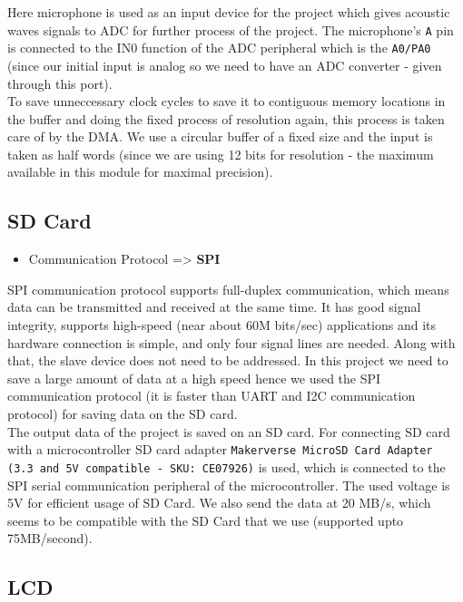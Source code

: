 \documentclass[11pt]{article}
\begin{document}
Here microphone is used as an input device for the project which gives acoustic waves signals to ADC for further process of the project. The microphone’s \texttt{A} pin is connected to the IN0 function of the ADC peripheral which is the \texttt{A0/PA0} (since our initial input is analog so we need to have an ADC converter - given through this port). \\

To save unneccessary clock cycles to save it to contiguous memory locations in the buffer and doing the fixed process of resolution again, this process is taken care of by the DMA. We use a circular buffer of a fixed size and the input is taken as half words (since we are using 12 bits for resolution - the maximum available in this module for maximal precision).


\subsection{SD Card}
\label{sec:org0bc22ef}

\begin{itemize}
\item Communication Protocol => \textbf{SPI}
\end{itemize}

SPI communication protocol supports full-duplex communication, which means data can be transmitted and received at the same time. It has good signal integrity, supports high-speed (near about 60M bits/sec) applications and its hardware connection is simple, and only four signal lines are needed. Along with that, the slave device does not need to be addressed. In this project we need to save a large amount of data at a high speed hence we used the SPI communication protocol (it is faster than UART and I2C communication protocol) for saving data on the SD card. \\

The output data of the project is saved on an SD card. For connecting SD card with a microcontroller SD card adapter \texttt{Makerverse MicroSD Card Adapter (3.3 and 5V compatible - SKU: CE07926)} is used, which is connected to the SPI serial communication peripheral of the microcontroller. The used voltage is 5V for efficient usage of SD Card. We also send the data at 20 MB/s, which seems to be compatible with the SD Card that we use (supported upto 75MB/second).

\subsection{LCD}
\label{sec:org56e7172}
\end{document}
